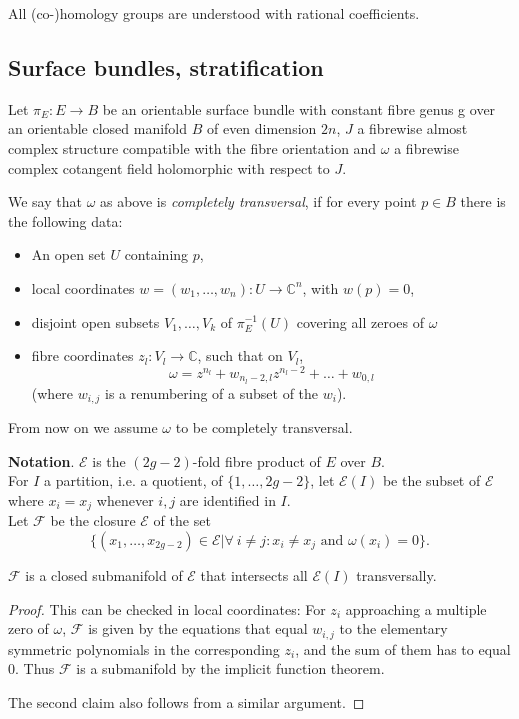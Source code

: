 All (co-)homology groups are understood with rational coefficients.

\subsection{Surface bundles, stratification}
Let $\pi_E : E \rightarrow B$ be an orientable surface bundle
with constant fibre genus g over an orientable closed manifold $B$
of even dimension $2n$, $J$ a fibrewise almost complex structure
compatible with the fibre orientation
and $\omega$ a fibrewise complex cotangent field holomorphic
with respect to $J$.

\begin{defn}
We say that $\omega$ as above is \emph{completely transversal},
if for every point $p \in B$ there is the following data:
\begin{itemize}
  \item An open set $U$ containing $p$,
  \item local coordinates $w=(w_1, \ldots , w_n) : U \rightarrow \mathbb{C}^n$,
        with $w(p) = 0$,
  \item disjoint open subsets $V_1, \ldots, V_k$ of $\pi_E^{-1}(U)$ covering all
        zeroes of $\omega$
  \item fibre coordinates $z_l : V_l \to \mathbb{C}$, such that
        on $V_l$,
        $$\omega = z^{n_l} + w_{n_l-2,l} z^{n_l-2} + \ldots + w_{0,l}$$
        (where $w_{i,j}$ is a renumbering of a subset of the $w_i$).
\end{itemize}
\end{defn}

From now on we assume $\omega$ to be completely transversal.

\noindent \textbf{Notation}.
$\mathcal{E}$ is the $(2g-2)$-fold fibre product of $E$ over $B$. \\
For $I$ a partition, i.e. a quotient, of $\{1, \ldots, 2g-2\}$, let
$\mathcal{E}(I)$ be the subset of $\mathcal{E}$ where $x_i = x_j$ whenever
$i,j$ are identified in $I$. \\
Let $\mathcal{F}$ be the closure $\mathcal{E}$ of the set
$$\{ ( x_1 , \ldots , x_{2g-2} ) \in \mathcal{E} \vert \forall\
i\neq j: x_i \neq x_j \textrm{ and } \omega(x_i) = 0 \} .$$ 

\begin{prop} $\mathcal{F}$ is a closed submanifold of $\mathcal{E}$ that
intersects all $\mathcal{E}(I)$ transversally.
\end{prop}
\begin{proof}
This can be checked in local coordinates: For $z_i$ approaching a
multiple zero of $\omega$, $\mathcal{F}$ is given by the equations
that equal $w_{i,j}$ to the elementary symmetric polynomials in
the corresponding $z_i$, and the sum of them has to equal $0$.
Thus $\mathcal{F}$ is a submanifold by the implicit function theorem.

The second claim also follows from a similar argument.
\end{proof}

